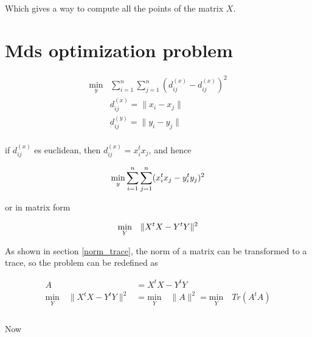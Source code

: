 \documentclass{article}
\begin{document}
    Which gives a way to compute all the points of the matrix $X$.

    \section{Mds optimization problem}

    \begin{equation*}
        \begin{aligned}
            \underset{y}{\text{min}}  & \sum_{i=1}^n \sum_{j=1}^n ( d^{(x)}_{ij} - d^{(x)}_{ij} )^2 \\
            & d_{ij}^{(x)} = \lVert x_i - x_j \rVert\\
            & d_{ij}^{(y)} = \lVert y_i - y_j \rVert
        \end{aligned}
    \end{equation*}\\

    if $d_{ij}^{(x)}$ es euclidean, then $d_{ij}^{(x)} = x_i^t x_j$, and hence

    \begin{equation*}
        \underset{y}{\text{min}} \sum_{i=1}^n \sum_{j=1}^n ( x_i^t x_j - y_i^t y_j )^2 \\
    \end{equation*}

    or in matrix form

    \begin{equation*}
        \underset{Y}{\text{min}} \quad \lVert X^t X - Y^t Y \rVert^2 \\
    \end{equation*}

    As shown in section \ref{norm_trace}, the norm of a matrix can be transformed
    to a trace, so the problem can be redefined as

    \begin{equation*}
        \begin{aligned}
            A &= X^tX - Y^tY\\
            \underset{Y}{\text{min}} \quad \lVert X^t X - Y^t Y \rVert^2
            &=
            \underset{Y}{\text{min}} \quad \lVert A \rVert^2
            =
            \underset{Y}{\text{min}} \quad Tr(A^tA) \\
        \end{aligned}
    \end{equation*}\\

    Now
\end{document}

